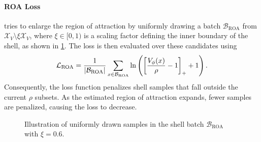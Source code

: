 \paragraph{ROA Loss} tries to enlarge the region of attraction by uniformly drawing a batch 
$\mathcal{B}_{\mathrm{ROA}}$ from $\mathcal{X}_V \setminus \xi \mathcal{X}_V$, 
where $\xi \in [0, 1)$ is a scaling factor defining the inner boundary of the shell, 
as shown in \cref{fig:box-shell}.
The loss is then evaluated over these candidates 
using~\cite{yangLyapunovstableNeuralControl2024} 
\begin{equation}
    \label{eq:roa-loss}
    \mathcal{L}_{\mathrm{ROA}} = \frac{1}{|\mathcal{B}_{\mathrm{ROA}}|} \sum_{x \in \mathcal{B}_{\mathrm{ROA}}} \ln \left(
        \left[
            \frac{V_\phi(x)}{\rho} - 1
        \right]_+ + 1
    \right).
\end{equation}
Consequently, the loss function penalizes shell samples that fall outside the current $\rho$ subsets. 
As the estimated region of attraction expands, fewer samples are penalized, 
causing the loss to decrease.

\begin{figure}[htbp]
    \centering
    
    \caption[Box Shell Sampling]{
        Illustration of uniformly drawn samples in the shell batch $\mathcal{B}_{\mathrm{ROA}}$ with $\xi = 0.6$.}
    \label{fig:box-shell}
\end{figure}




